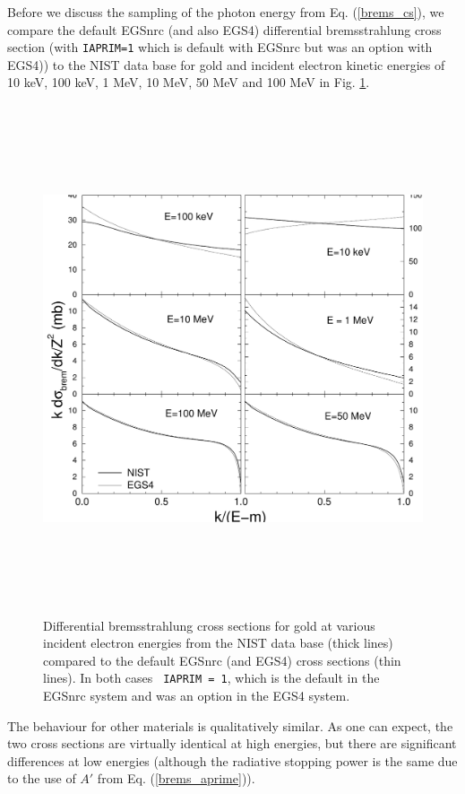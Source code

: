 Before we discuss the sampling of the photon energy from 
Eq. (\ref{brems_cs}), we compare the default EGSnrc 
(and also EGS4) differential bremsstrahlung cross section 
(with {\tt IAPRIM=1} which is default with EGSnrc but was an option with
EGS4)) to the NIST data base for gold and 
incident electron kinetic energies of 10 keV, 100 keV, 
1 MeV, 10 MeV, 50 MeV and 100 MeV in Fig. \ref{brems_fig1}. 
\begin{figure}[htp]
\includegraphics[height=15cm,width=15cm]{figures/brem79}
\caption[Bremsstrahlung cross sections]{\label{brems_fig1} 
Differential bremsstrahlung cross sections 
for gold at various incident electron energies from the NIST data base 
\protect\cite{SB85,SB86a} (thick lines) compared to the 
default EGSnrc (and EGS4) cross sections (thin lines). In both cases {\tt
IAPRIM = 1}, which is the default in the EGSnrc system and was an option 
in the EGS4 system.}
 
\end{figure}
The behaviour for other materials is qualitatively similar. 
As one can expect, the two cross sections are virtually 
identical at high energies, but there are significant differences 
at low energies (although the radiative stopping power is the 
same due to the use of $A'$ from Eq. (\ref{brems_aprime})). 

